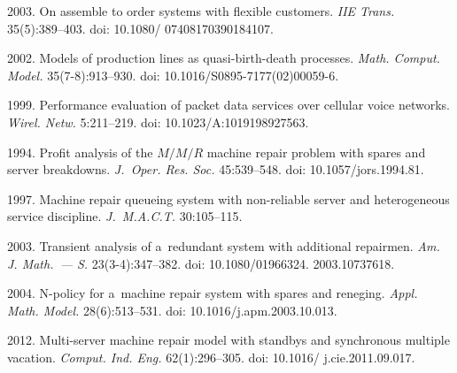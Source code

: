   \begin{multicols}{2}

\renewcommand{\bibname}{\protect\rmfamily References}

{\small\frenchspacing
 {%
 \begin{thebibliography}{99} 

 2003. On assemble
to order systems with flexible customers. \textit{IIE Trans.} 35(5):389--403. doi: 10.1080/ 07408170390184107.

 2002. Models of production lines as quasi-birth-death processes. \textit{Math. Comput. Model.} 35(7-8):913--930. doi: 10.1016/S0895-7177(02)00059-6.

 1999. Performance evaluation of packet data services over cellular voice networks. 
\textit{Wirel. Netw.} 5:211--219. doi: 10.1023/A:1019198927563.


 1994. Profit analysis of the $M/M/R$ machine repair problem with spares and server breakdowns. 
\textit{J.~Oper. Res. Soc.} 45:539--548. doi: 10.1057/jors.1994.81.





 1997. Machine repair queueing system with non-reliable server and heterogeneous service discipline. 
\textit{J.~M.A.C.T.} 30:105--115.

 2003. Transient analysis of a~redundant system with additional repairmen. \textit{Am. J. Math.~--- S.} 23(3-4):347--382. doi: 10.1080/01966324. 2003.10737618.


 2004. 
\mbox{N-policy} for a~machine repair system with spares and reneging. \textit{Appl. Math. Model.} 28(6):513--531. doi: 10.1016/j.apm.2003.10.013.

 2012. Multi-server machine repair model with standbys and synchronous multiple vacation. 
\textit{Comput. Ind. Eng.} 62(1):296--305. doi: 10.1016/ j.cie.2011.09.017.


\end{thebibliography}}}
\end{multicols}
